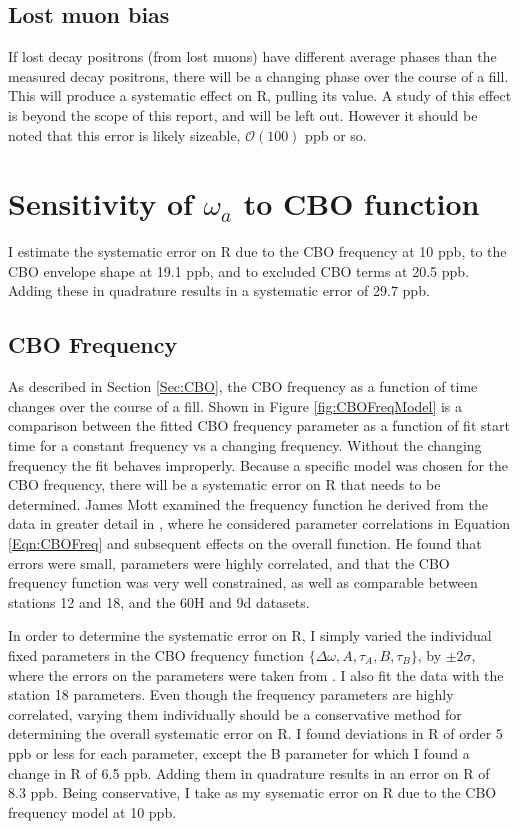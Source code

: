	\subsection{Lost muon bias}

		If lost decay positrons (from lost muons) have different average \gmtwo phases than the measured decay positrons, there will be a changing \gmtwo phase over the course of a fill. This will produce a systematic effect on R, pulling its value. A study of this effect is beyond the scope of this report, and will be left out. However it should be noted that this error is likely sizeable, $\mathcal{O}(100)$ ppb or so.


\section{Sensitivity of \texorpdfstring{$\omega_{a}$}{} to CBO function}
\label{Sec:SystematicCBO}

	I estimate the systematic error on R due to the CBO frequency at 10 ppb, to the CBO envelope shape at 19.1 ppb, and to excluded CBO terms at 20.5 ppb. Adding these in quadrature results in a systematic error of 29.7 ppb.

	\subsection{CBO Frequency}
	\label{Sec:CBOFreq}

	As described in Section \ref{Sec:CBO}, the CBO frequency as a function of time changes over the course of a fill. Shown in Figure \ref{fig:CBOFreqModel} is a comparison between the fitted CBO frequency parameter as a function of fit start time for a constant frequency vs a changing frequency. Without the changing frequency the fit behaves improperly. Because a specific model was chosen for the CBO frequency, there will be a systematic error on R that needs to be determined. James Mott examined the frequency function he derived from the data in greater detail in , where he considered parameter correlations in Equation \ref{Eqn:CBOFreq} and subsequent effects on the overall function. He found that errors were small, parameters were highly correlated, and that the CBO frequency function was very well constrained, as well as comparable between stations 12 and 18, and the 60H and 9d datasets. 

	In order to determine the systematic error on R, I simply varied the individual fixed parameters in the CBO frequency function $\{\Delta\omega, A, \tau_{A}, B, \tau_{B}\}$, by $\pm 2 \sigma$, where the errors on the parameters were taken from . I also fit the data with the station 18 parameters. Even though the frequency parameters are highly correlated, varying them individually should be a conservative method for determining the overall systematic error on R. I found deviations in R of order 5 ppb or less for each parameter, except the B parameter for which I found a change in R of 6.5 ppb. Adding them in quadrature results in an error on R of 8.3 ppb. Being conservative, I take as my sysematic error on R due to the CBO frequency model at 10 ppb.

